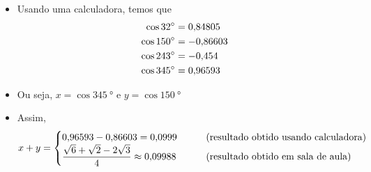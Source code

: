 \documentclass[brazilian]{article}
\newcommand{\bob}[1]{\pgfmathparse{#1}\pgfmathprintnumber[use comma, precision=6]{\pgfmathresult}}
\begin{document}
\begin{itemize}
    \item Usando uma calculadora, temos que
        \begin{align*}
            \cos{\SI{32}{\degree}} &= \bob{cos(32)}\\
            \cos{\SI{150}{\degree}} &= \bob{cos(150)}\\
            \cos{\SI{243}{\degree}} &= \bob{cos(243)}\\
            \cos{\SI{345}{\degree}} &= \bob{cos(345)} 
        \end{align*}
    \item Ou seja, \(x=\cos{\SI{345}{\degree}}\) e \(y=\cos{\SI{150}{\degree}}\)
    \item Assim, 
        \[
            x+y=
            \begin{cases}
                \bob{cos(345)}-\bob{-cos(150)} = \bob{cos(345)+cos(150)} 
                \qquad &\text{(resultado obtido usando calculadora)}\\
                \dfrac{\sqrt{6}+\sqrt{2}-2\sqrt{3}}{4} \approx \bob{(sqrt(6)+sqrt(2)-2*sqrt(3))/4} 
                \qquad &\text{(resultado obtido em sala de aula)}
            \end{cases}
        \]
\end{itemize}
\end{document}
